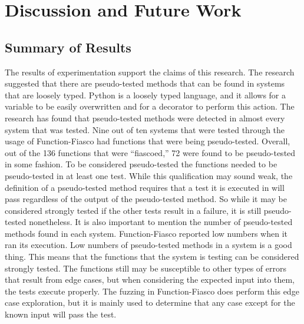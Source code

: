 %
%
%

\chapter{Discussion and Future Work}\label{ch:conclusion}

\section{Summary of Results}

The results of experimentation support the claims of this research. The research suggested that there are pseudo-tested methods that can be found in systems that are loosely typed. Python is a loosely typed language, and it allows for a variable to be easily overwritten and for a decorator to perform this action.
The research has found that pseudo-tested methods were detected in almost every system that was tested. Nine out of ten systems that were tested through the usage of Function-Fiasco had functions that were being pseudo-tested. Overall, out of the 136 functions that were ``fiascoed,'' 72 were found to be pseudo-tested in some fashion. To be considered pseudo-tested the functions needed to be pseudo-tested in at least one test. While this qualification may sound weak, the definition of a pseudo-tested method requires that a test it is executed in will pass regardless of the output of the pseudo-tested method. So while it may be considered strongly tested if the other tests result in a failure, it is still pseudo-tested nonetheless. It is also important to mention the number of pseudo-tested methods found in each system. Function-Fiasco reported low numbers when it ran its execution. Low numbers of pseudo-tested methods in a system is a good thing. This means that the functions that the system is testing can be considered strongly tested. The functions still may be susceptible to other types of errors that result from edge cases, but when considering the expected input into them, the tests execute properly. The fuzzing in Function-Fiasco does perform this edge case exploration, but it is mainly used to determine that any case except for the known input will pass the test.

